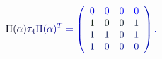 \documentclass[12pt]{article}
\begin{document}
\makeatletter
\renewcommand*{\@textcolor}[3]{%
  \protect\leavevmode
  \begingroup
    \color#1{#2}#3%
  \endgroup
}
\makeatother
\begin{displaymath}
\mathcolor[RGB]{0,0,15}{\Pi} \mathcolor[RGB]{0,0,30}{(} \mathcolor[RGB]{0,0,45}{\alpha} \mathcolor[RGB]{0,0,60}{)} \mathcolor[RGB]{0,0,75}{\tau} _ { \mathcolor[RGB]{0,0,90}{4} } \mathcolor[RGB]{0,0,105}{\Pi} \mathcolor[RGB]{0,0,120}{(} \mathcolor[RGB]{0,0,135}{\alpha} \mathcolor[RGB]{0,0,150}{)} ^ { \mathcolor[RGB]{0,0,165}{T} } \mathcolor[RGB]{0,0,180}{=} \mathcolor[RGB]{0,0,195}{\left(} \begin{array} {cccc} { \mathcolor[RGB]{0,0,210}{0} } & { \mathcolor[RGB]{0,0,225}{0} } & { \mathcolor[RGB]{0,0,240}{0} } & { \mathcolor[RGB]{0,0,255}{0} } \\ { \mathcolor[RGB]{0,15,0}{1} } & { \mathcolor[RGB]{0,15,15}{0} } & { \mathcolor[RGB]{0,15,30}{0} } & { \mathcolor[RGB]{0,15,45}{1} } \\ { \mathcolor[RGB]{0,15,60}{1} } & { \mathcolor[RGB]{0,15,75}{1} } & { \mathcolor[RGB]{0,15,90}{0} } & { \mathcolor[RGB]{0,15,105}{1} } \\ { \mathcolor[RGB]{0,15,120}{1} } & { \mathcolor[RGB]{0,15,135}{0} } & { \mathcolor[RGB]{0,15,150}{0} } & { \mathcolor[RGB]{0,15,165}{0} } \end{array} \mathcolor[RGB]{0,15,180}{\right)} \mathcolor[RGB]{0,15,195}{.}
\end{displaymath}
\end{document}
